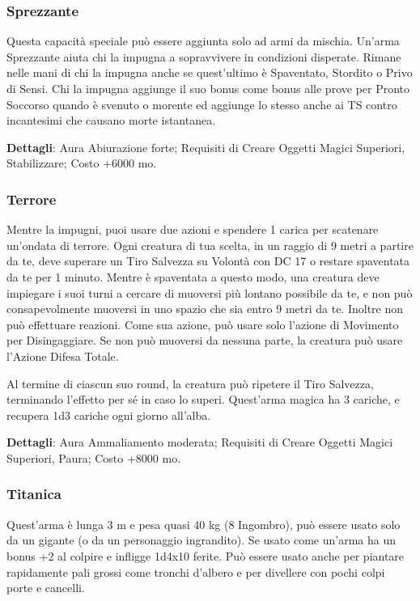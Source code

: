 \begin{multicols}{2}
	\subsubsection*{Sprezzante}

	Questa capacità speciale può essere aggiunta solo ad armi da mischia. Un'arma Sprezzante aiuta chi la impugna a sopravvivere in condizioni disperate. Rimane nelle mani di chi la impugna anche se quest'ultimo è Spaventato, Stordito o Privo di Sensi. Chi la impugna aggiunge il suo bonus come bonus alle prove per Pronto Soccorso quando è svenuto o morente ed aggiunge lo stesso anche ai TS contro incantesimi che causano morte istantanea.

	\textbf{Dettagli}: Aura Abiurazione forte; Requisiti di Creare Oggetti Magici Superiori, Stabilizzare; Costo +6000 mo.

	\subsubsection*{Terrore}

	Mentre la impugni, puoi usare due azioni e spendere 1 carica per scatenare un'ondata di terrore.
	Ogni creatura di tua scelta, in un raggio di 9 metri a partire da te, deve superare un Tiro Salvezza su Volontà con DC 17 o restare spaventata da te per 1 minuto. Mentre è spaventata a questo modo, una creatura deve impiegare i suoi turni a cercare di muoversi più lontano possibile da te, e non può consapevolmente muoversi in uno spazio che sia entro 9 metri da te. Inoltre non può effettuare reazioni. Come sua azione, può usare solo l'azione di Movimento per Disingaggiare. Se non può muoversi da nessuna parte, la creatura può usare l'Azione Difesa Totale.

	Al termine di ciascun suo round, la creatura può ripetere il Tiro Salvezza, terminando l'effetto per sé in caso lo superi. Quest'arma magica ha 3 cariche, e recupera 1d3 cariche ogni giorno all'alba.

	\textbf{Dettagli}: Aura Ammaliamento moderata; Requisiti di Creare Oggetti Magici Superiori, Paura; Costo +8000 mo.

	\subsubsection*{Titanica}

	Quest'arma è lunga 3 m e pesa quasi 40 kg (8 Ingombro), può essere usato solo da un gigante (o da un personaggio ingrandito). Se usato come un’arma ha un bonus +2 al colpire e infligge 1d4x10 ferite. Può essere usato anche per piantare rapidamente pali grossi come tronchi d'albero e per divellere con pochi colpi porte e cancelli.


\end{multicols}
